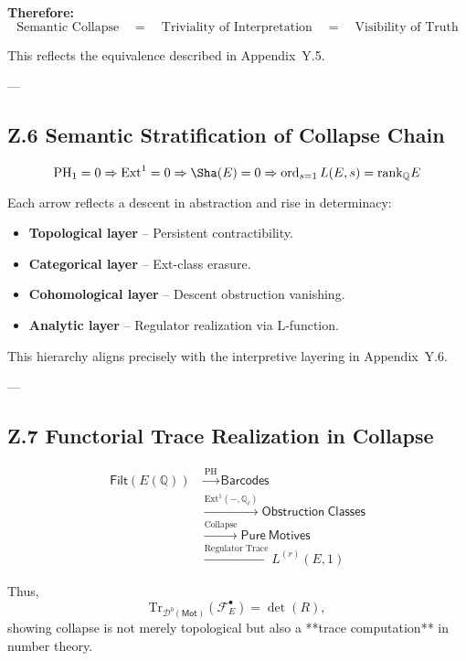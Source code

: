 \documentclass[11pt]{article}
\theoremstyle{definition}
\begin{document}
\textbf{Therefore:}
\[
\text{Semantic Collapse} \quad = \quad \text{Triviality of Interpretation} \quad = \quad \text{Visibility of Truth}
\]

This reflects the equivalence described in Appendix~Y.5.

---

\subsection*{Z.6 Semantic Stratification of Collapse Chain}

\[
\mathrm{PH}_1 = 0 \Rightarrow \mathrm{Ext}^1 = 0 \Rightarrow \Sha(E) = 0 \Rightarrow \operatorname{ord}_{s=1} L(E,s) = \mathrm{rank}_\mathbb{Q} E
\]

Each arrow reflects a descent in abstraction and rise in determinacy:

\begin{itemize}
  \item \textbf{Topological layer} – Persistent contractibility.
  \item \textbf{Categorical layer} – Ext-class erasure.
  \item \textbf{Cohomological layer} – Descent obstruction vanishing.
  \item \textbf{Analytic layer} – Regulator realization via L-function.
\end{itemize}

This hierarchy aligns precisely with the interpretive layering in Appendix~Y.6.

---

\subsection*{Z.7 Functorial Trace Realization in Collapse}

\begin{align*}
\mathsf{Filt}(E(\mathbb{Q})) 
&\xrightarrow{\mathrm{PH}} \mathsf{Barcodes} \\
&\xrightarrow{\text{Ext}^1(-, \mathbb{Q}_\ell)} \mathsf{Obstruction~Classes} \\
&\xrightarrow{\text{Collapse}} \mathsf{Pure~Motives} \\
&\xrightarrow{\text{Regulator~Trace}} L^{(r)}(E,1)
\end{align*}

Thus,
\[
\mathrm{Tr}_{\mathcal{D}^b(\mathsf{Mot})}(\mathcal{F}_E^\bullet) = \det(R),
\]
showing collapse is not merely topological but also a **trace computation** in number theory.
\end{document}
